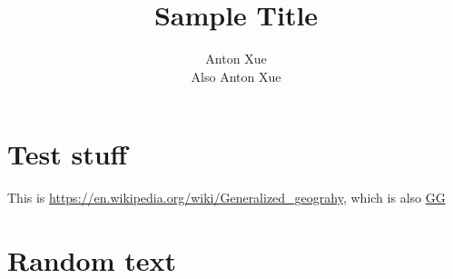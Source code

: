 \documentclass[10pt]{article}
\author{Anton Xue\\Also Anton Xue}
\title{Sample Title}
\date{}
\begin{document}
\maketitle

\section{Test stuff}
This is \url{https://en.wikipedia.org/wiki/Generalized_geograhy}, which
is also \href{https://en.wikipedia.org/wiki/Generalized_geograhy}{GG}

\section{Random text}
\lipsum
\end{document}
